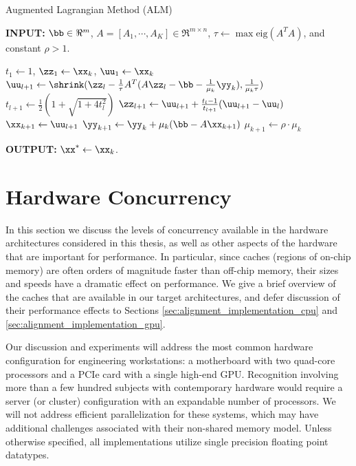  \begin{algorithm}[h]
\caption{Augmented Lagrangian Method (ALM)}
\small
{\bf INPUT:} $\bb \in \Re^m$, $A=[A_1,\cdots, A_K] \in \Re^{m \times n}$, $\tau\leftarrow \max\mbox{eig}(A^TA)$, and constant $\rho>1$.
\begin{algorithmic}[1]
\STATE $t_1 \leftarrow 1$, $\zz_1 \leftarrow \xx_k$, $\uu_1 \leftarrow \xx_k$ 
\STATE $\uu_{l+1}  \leftarrow \shrink(\zz_l - \frac{1}{\tau}A^T(A\zz_l - \bb - \frac{1}{\mu_k}\yy_k), \frac{1}{\mu_k\tau})$
\STATE $t_{l+1} \leftarrow \frac{1}{2}( 1 + \sqrt{1+4t_l^2})$
\STATE $\zz_{l+1} \leftarrow \uu_{l+1}+ \frac{t_l - 1}{t_{l+1}}(\uu_{l+1} - \uu_l)$ 
\ENDWHILE 
\STATE $\xx_{k+1} \leftarrow \uu_{l+1}$ 
\STATE $\yy_{k+1} \leftarrow \yy_k + \mu_k (\bb - A\xx_{k+1})$ 
\STATE $\mu_{k+1} \leftarrow \rho\cdot\mu_k$ 
\ENDWHILE 
\end{algorithmic}

{\bf OUTPUT:} $\xx^* \leftarrow \xx_k$.
\label{alg:alm} 
\end{algorithm}

\section{Hardware Concurrency} \label{sec:concurrency}
In this section we discuss the levels of concurrency available in the hardware
architectures considered in this thesis, as well as other aspects of the
hardware that are important for performance.  In particular, since caches
(regions of on-chip memory) are often orders of magnitude faster than off-chip
memory, their sizes and speeds have a dramatic effect on performance.  We give a
brief overview of the caches that are available in our target architectures,
and defer discussion of their performance effects to Sections
\ref{sec:alignment_implementation_cpu} and
\ref{sec:alignment_implementation_gpu}.

Our discussion and experiments will address the most common hardware
configuration for engineering workstations: a motherboard with two quad-core
processors and a PCIe card with a single high-end GPU.  
Recognition involving more than a few hundred subjects with contemporary hardware
would require a server (or cluster) configuration with an expandable 
number of processors.  We will not address efficient parallelization for 
these systems, which may have additional challenges associated with
their non-shared memory model.
Unless otherwise specified, all implementations utilize single precision
floating point datatypes.  

